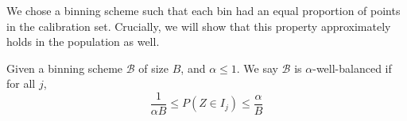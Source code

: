 






We chose a binning scheme such that each bin had an equal proportion of points in the calibration set. Crucially, we will show that this property approximately holds in the population as well.

\begin{definition}
Given a binning scheme $\mathcal{B}$ of size $B$, and $\alpha \leq 1$. We say $\mathcal{B}$ is $\alpha$-well-balanced if for all $j$,
\[ \frac{1}{\alpha B} \leq P(Z \in I_j) \leq \frac{\alpha}{B}\]
\end{definition}


